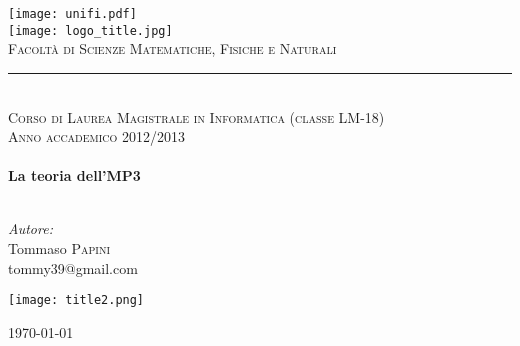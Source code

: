 \begin{titlepage}
	\begin{center}
		
		\texttt{[image: unifi.pdf]}\\[0.5cm]
		
		\texttt{[image: logo\_title.jpg]}\\
		\textsc{Facoltà di Scienze Matematiche, Fisiche e Naturali}\\
		\rule{0.8\linewidth}{0.2mm}\\
		\textsc{\footnotesize Corso di Laurea Magistrale in Informatica (classe LM-18)}\\[1.8cm]
		
		\textsc{Anno accademico 2012/2013}\\
		\HRule \\[0.4cm]
		{\huge \bfseries La teoria dell'MP3}\\[0.4cm]
		\HRule \\[0.6cm]
		
		\begin{flushleft}
			\begin{minipage}{0.4\textwidth}
				\emph{Autore:}\\
				Tommaso \textsc{Papini}\\
				tommy39@gmail.com
			\end{minipage}
		\end{flushleft}
		
		\texttt{[image: title2.png]}
		
		\vfill
		
		{\large \monthyear\today}
		
	\end{center}
\end{titlepage}